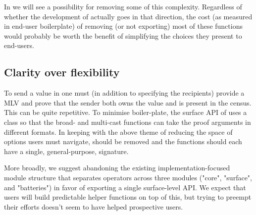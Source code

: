 In  we will see a possibility for removing some of this complexity.
Regardless of whether the development of \MultiChor actually goes in that direction,
the cost (as measured in end-user boilerplate) of removing (or not exporting) most of these functions
would probably be worth the benefit of simplifying the choices they present to end-users.

\subsection{Clarity over flexibility}

To send a value in \MultiChor one must (in addition to specifying the recipients)
provide a MLV and prove that the sender both owns the value and is present in the census.
This can be quite repetitive.
To minimise boiler-plate, the surface API of \MultiChor uses a class 
so that the broad- and multi-cast functions can take the proof arguments in different formats.
In keeping with the above theme of reducing the space of options users must navigate,
 should be removed and the functions should each have a single, general-purpose, signature.

More broadly, we suggest abandoning the existing implementation-focused module structure
that separates operators across three modules ("core", "surface", and "batteries")
in favor of exporting a single surface-level API.
We expect that users will build predictable helper functions on top of this,
but trying to preempt their efforts doesn't seem to have helped prospective users.

